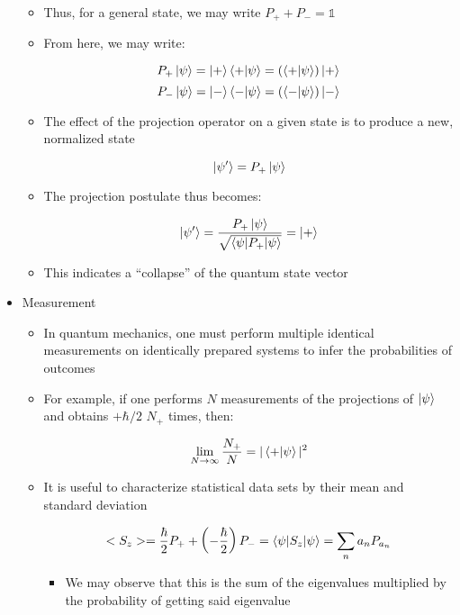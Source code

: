 \begin{itemize}
\begin{itemize}
      \item Thus, for a general state, we may write $P_++P_-=\mathbb{1}$

      \item From here, we may write:

        $$P_+\ket{\psi}=\ket{+}\bra{+}\ket{\psi}=(\bra{+}\ket{\psi})\ket{+}$$
        $$P_-\ket{\psi}=\ket{-}\bra{-}\ket{\psi}=(\bra{-}\ket{\psi})\ket{-}$$

      \item The effect of the projection operator on a given state is to produce a new, normalized state

        $$\ket{\psi'}=P_+\ket{\psi}$$

      \item The projection postulate thus becomes:

        $$\ket{\psi'}=\frac{P_+\ket{\psi}}{\sqrt{\bra{\psi|P_+}\ket{\psi}}}=\ket{+}$$
        
      \item This indicates a ``collapse'' of the quantum state vector

    \end{itemize}

  \item Measurement

    \begin{itemize}

      \item In quantum mechanics, one must perform multiple identical measurements on identically prepared systems to infer the probabilities of outcomes

      \item For example, if one performs $N$ measurements of the projections of $\ket{\psi}$ and obtains $+\hbar/2$ $N_+$ times, then:

        $$\lim_{N\to\infty}\frac{N_+}{N}=|\bra{+}\ket{\psi}|^2$$

      \item It is useful to characterize statistical data sets by their mean and standard deviation

        $$<S_z>=\frac{\hbar}{2}P_++\left(-\frac{\hbar}{2}\right)P_-=\bra{\psi|S_z}\ket{\psi}=\sum_{n}a_nP_{a_n}$$

        \begin{itemize}

          \item We may observe that this is the sum of the eigenvalues multiplied by the probability of getting said eigenvalue


\end{itemize}
\end{itemize}
\end{itemize}
